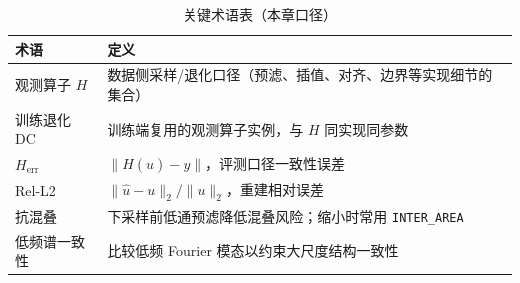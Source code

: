 \begin{table}[htbp]
\centering
\caption{关键术语表（本章口径）}
\label{tab:glossary-ch1}
\begin{tabularx}{\textwidth}{@{}lX@{}}
\toprule
术语 & 定义 \\
\midrule
观测算子 \(H\) &
数据侧采样/退化口径（预滤、插值、对齐、边界等实现细节的集合） \\
训练退化 \(\mathrm{DC}\) &
训练端复用的观测算子实例，与 \(H\) 同实现同参数 \\
\(H_{\mathrm{err}}\) &
\(\lVert H(\hat{u})-y\rVert\)，评测口径一致性误差 \\
Rel-L2 &
\(\lVert \hat{u}-u\rVert_2/\lVert u\rVert_2\)，重建相对误差 \\
抗混叠 &
下采样前低通预滤降低混叠风险；缩小时常用 \texttt{INTER\_AREA} \parencite{opencv_resize} \\
低频谱一致性 &
比较低频 Fourier 模态以约束大尺度结构一致性 \\
\bottomrule
\end{tabularx}
\end{table}
